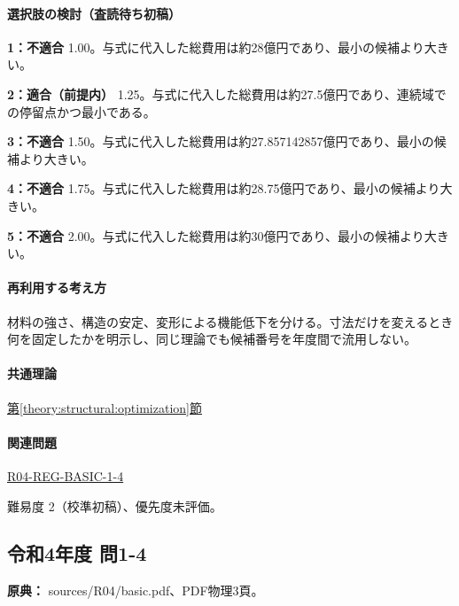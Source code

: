 \paragraph{選択肢の検討（査読待ち初稿）}\mbox{}\par

\noindent\textbf{1：不適合} 1.00。与式に代入した総費用は約28億円であり、最小の候補より大きい。\par

\noindent\textbf{2：適合（前提内）} 1.25。与式に代入した総費用は約27.5億円であり、連続域での停留点かつ最小である。\par

\noindent\textbf{3：不適合} 1.50。与式に代入した総費用は約27.857142857億円であり、最小の候補より大きい。\par

\noindent\textbf{4：不適合} 1.75。与式に代入した総費用は約28.75億円であり、最小の候補より大きい。\par

\noindent\textbf{5：不適合} 2.00。与式に代入した総費用は約30億円であり、最小の候補より大きい。\par

\paragraph{再利用する考え方} 材料の強さ、構造の安定、変形による機能低下を分ける。寸法だけを変えるとき何を固定したかを明示し、同じ理論でも候補番号を年度間で流用しない。

\paragraph{共通理論} \hyperref[theory:structural:optimization]{第\ref*{theory:structural:optimization}節}

\paragraph{関連問題} \hyperref[q:r04-reg-basic-1-4]{R04-REG-BASIC-1-4}

\par 難易度 2（校準初稿）、優先度未評価。

\subsection{令和4年度 問1-4}
\label{q:r04-reg-basic-1-4}

\noindent\textbf{原典：} sources/R04/basic.pdf、PDF物理3頁。

